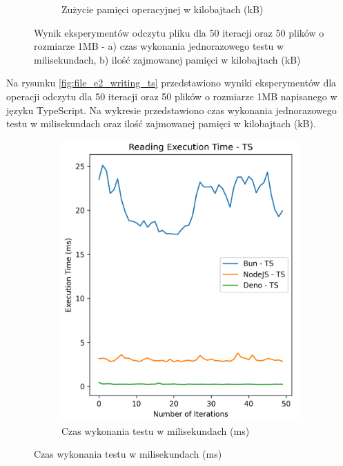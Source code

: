 \begin{figure}[H]
\begin{subfigure}[b]{0.4\textwidth}
    \caption{Zużycie pamięci operacyjnej w kilobajtach (kB)}
    \label{fig:file_e2_reading_ts_memory}
  \end{subfigure}
  \caption{Wynik eksperymentów odczytu pliku dla 50 iteracji oraz 50 plików o rozmiarze 1MB - a) czas wykonania jednorazowego testu w milisekundach, b) ilość zajmowanej pamięci w kilobajtach (kB)}
  \label{fig:file_e2_reading_ts}
\end{figure}

Na rysunku \ref{fig:file_e2_writing_ts} przedstawiono wyniki eksperymentów dla operacji odczytu dla 50 iteracji oraz 50 plików o rozmiarze 1MB napisanego w języku TypeScript. Na wykresie przedstawiono czas wykonania jednorazowego testu w milisekundach oraz ilość zajmowanej pamięci w kilobajtach (kB).

\begin{figure}[H]
  \centering
  \begin{subfigure}[b]{0.4\textwidth}
    \centering
    \includegraphics[width=\textwidth]{Figures/files/files_writing_50_2000_50_ts_time.png}
    \caption{Czas wykonania testu w milisekundach (ms)}
    \label{fig:file_e2_writing_ts_time}

\end{subfigure}
\end{figure}
